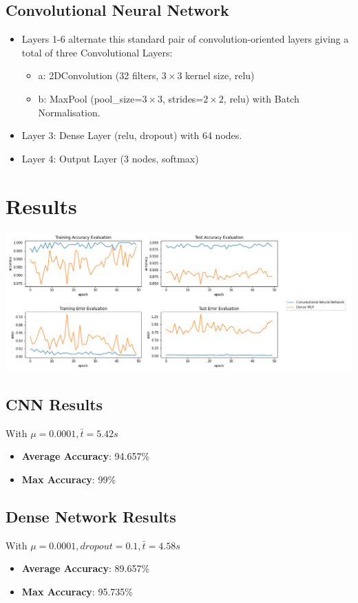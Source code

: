 \documentclass[12pt]{article}
\begin{document}
\subsection{Convolutional Neural Network}
\begin{itemize}
\item Layers 1-6 alternate this standard pair of convolution-oriented layers giving a total of three Convolutional Layers:
\begin{itemize}
\item a: 2DConvolution (32 filters, $3\times 3$ kernel size, relu)
\item b: MaxPool (pool\_size=$3\times 3$, strides=$2\times 2$, relu)  with Batch Normalisation.
\end{itemize}
\item Layer 3: Dense Layer (relu, dropout) with 64 nodes.
\item Layer 4: Output Layer (3 nodes, softmax)

\end{itemize}
\section{Results}
\includegraphics[width= \textwidth]{accuracyMeasures.png}
\subsection{CNN Results}
With $\mu=0.0001, \bar{t}=5.42s$
\begin{itemize}
\item \textbf{Average Accuracy}: 94.657\%
\item \textbf{Max Accuracy}: 99\%
\end{itemize}

\subsection{Dense Network Results}
With $\mu=0.0001, \textit{dropout}=0.1, \bar{t}=4.58s$
\begin{itemize}
\item \textbf{Average Accuracy}: 89.657\%
\item \textbf{Max Accuracy}: 95.735\%
\end{itemize}
\end{document}
